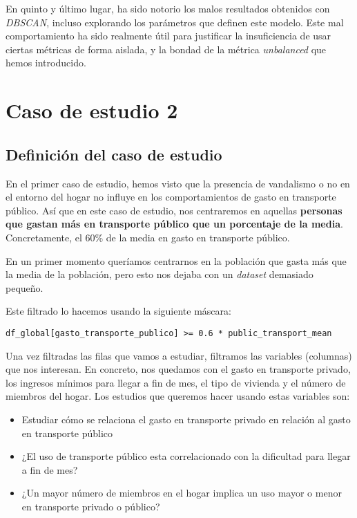\documentclass[11pt]{article}
\begin{document}
En quinto y último lugar, ha sido notorio los malos resultados obtenidos con \emph{DBSCAN}, incluso explorando los parámetros que definen este modelo. Este mal comportamiento ha sido realmente útil para justificar la insuficiencia de usar ciertas métricas de forma aislada, y la bondad de la métrica \emph{unbalanced} que hemos introducido.

\pagebreak

\section{Caso de estudio 2}

\subsection{Definición del caso de estudio}

En el primer caso de estudio, hemos visto que la presencia de vandalismo o no en el entorno del hogar no influye en los comportamientos de gasto en transporte público. Así que en este caso de estudio, nos centraremos en aquellas \textbf{personas que gastan más en transporte público que un porcentaje de la media}. Concretamente, el 60\% de la media en gasto en transporte público.

En un primer momento queríamos centrarnos en la población que gasta más que la media de la población, pero esto nos dejaba con un \emph{dataset} demasiado pequeño.

Este filtrado lo hacemos usando la siguiente máscara:

\lstinline{df_global[gasto_transporte_publico] >= 0.6 * public_transport_mean}


Una vez filtradas las filas que vamos a estudiar, filtramos las variables (columnas) que nos interesan. En concreto, nos quedamos con el gasto en transporte privado, los ingresos mínimos para llegar a fin de mes, el tipo de vivienda y el número de miembros del hogar. Los estudios que queremos hacer usando estas variables son:


\begin{itemize}
    \item Estudiar cómo se relaciona el gasto en transporte privado en relación al gasto en transporte público
    \item ¿El uso de transporte público esta correlacionado con la dificultad para llegar a fin de mes?
    \item ¿Un mayor número de miembros en el hogar implica un uso mayor o menor en transporte privado o público?
\end{itemize}
\end{document}
